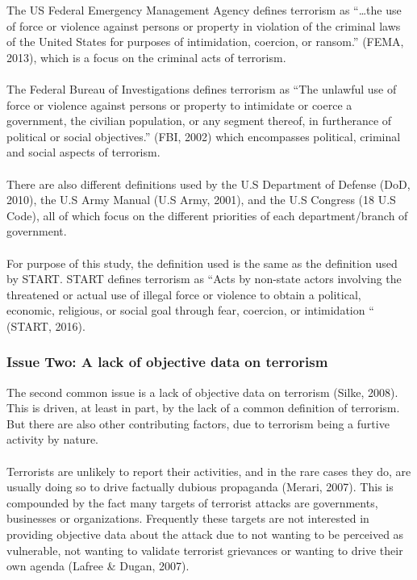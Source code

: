 \documentclass[10pt,a4paper]{article}
\begin{document}
The US Federal Emergency Management Agency defines terrorism as “…the use of force or violence against persons or property in violation of the criminal laws of the United States for purposes of intimidation, coercion, or ransom.” (FEMA, 2013), which is a focus on the criminal acts of terrorism. \\\\ 

The Federal Bureau of Investigations defines terrorism as “The unlawful use of force or violence against persons or property to intimidate or coerce a government, the civilian population, or any segment thereof, in furtherance of political or social objectives.” (FBI, 2002) which encompasses political, criminal and social aspects of terrorism.  \\\\

There are also different definitions used by the U.S Department of Defense (DoD, 2010), the U.S Army Manual (U.S Army, 2001), and the U.S Congress (18 U.S Code), all of which focus on the different priorities of each department/branch of government. \\\\

For purpose of this study, the definition used is the same as the definition used by START. START defines terrorism as “Acts by non-state actors involving the threatened or actual use of illegal force or violence to obtain a political, economic, religious, or social goal through fear, coercion, or intimidation “ (START, 2016). 


			\subsubsection{Issue Two: A lack of objective data on terrorism}

The second common issue is a lack of objective data on terrorism (Silke, 2008). This is driven, at least in part, by the lack of a common definition of terrorism. But there are also other contributing factors, due to terrorism being a furtive activity by nature. \\\\

Terrorists are unlikely to report their activities, and in the rare cases they do, are usually doing so to drive factually dubious propaganda (Merari, 2007).  This is compounded by the fact many targets of terrorist attacks are governments, businesses or organizations. Frequently these targets are not interested in providing objective data about the attack due to not wanting to be perceived as vulnerable, not wanting to validate terrorist grievances or wanting to drive their own agenda (Lafree \& Dugan, 2007).\\\\
\end{document}
